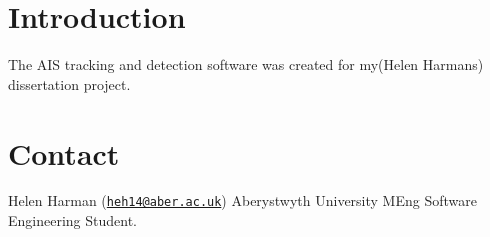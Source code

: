 \hypertarget{index_intro_sec}{}\section{Introduction}\label{index_intro_sec}
The A\+I\+S tracking and detection software was created for my(Helen Harman\textquotesingle{}s) dissertation project.\hypertarget{index_contact_sec}{}\section{Contact}\label{index_contact_sec}
Helen Harman (\href{mailto:heh14@aber.ac.uk}{\tt heh14@aber.\+ac.\+uk}) Aberystwyth University M\+Eng Software Engineering Student. 